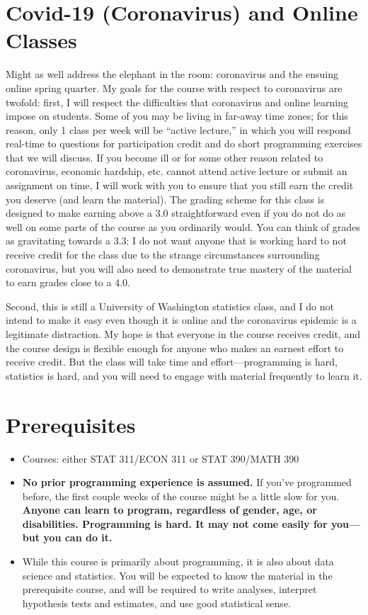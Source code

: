 \documentclass[12pt]{article}
\begin{document}
\section*{Covid-19 (Coronavirus) and Online Classes}

Might as well address the elephant in the room: coronavirus and the ensuing online spring quarter. My goals for the course with respect to coronavirus are twofold: first, I will respect the difficulties that coronavirus and online learning impose on students. Some of you may be living in far-away time zones; for this reason, only 1 class per week will be ``active lecture,'' in which you will respond real-time to questions for participation credit and do short programming exercises that we will discuss. If you become ill or for some other reason related to coronavirus, economic hardship, etc. cannot attend active lecture or submit an assignment on time, I will work with you to ensure that you still earn the credit you deserve (and learn the material). The grading scheme for this class is designed to make earning above a 3.0 straightforward even if you do not do as well on some parts of the course as you ordinarily would. You can think of grades as gravitating towards a 3.3: I do not want anyone that is working hard to not receive credit for the class due to the strange circumstances surrounding coronavirus, but you will also need to demonstrate true mastery of the material to earn grades close to a 4.0.

Second, this is still a University of Washington statistics class, and I do not intend to make it easy even though it is online and the coronavirus epidemic is a legitimate distraction. My hope is that everyone in the course receives credit, and the course design is flexible enough for anyone who makes an earnest effort to receive credit. But the class will take time and effort---programming is hard, statistics is hard, and you will need to engage with material frequently to learn it.

\section*{Prerequisites}

\begin{itemize}
	\item Courses: either STAT 311/ECON 311 or STAT 390/MATH 390
	\item \textbf{No prior programming experience is assumed.} If you've programmed before, the first couple weeks of the course might be a little slow for you. \textbf{Anyone can learn to program, regardless of gender, age, or disabilities. Programming is hard. It may not come easily for you---but you can do it.}
	\item While this course is primarily about programming, it is also about data science and statistics. You will be expected to know the material in the prerequisite course, and will be required to write analyses, interpret hypothesis tests and estimates, and use good statistical sense.
\end{itemize}
\end{document}
